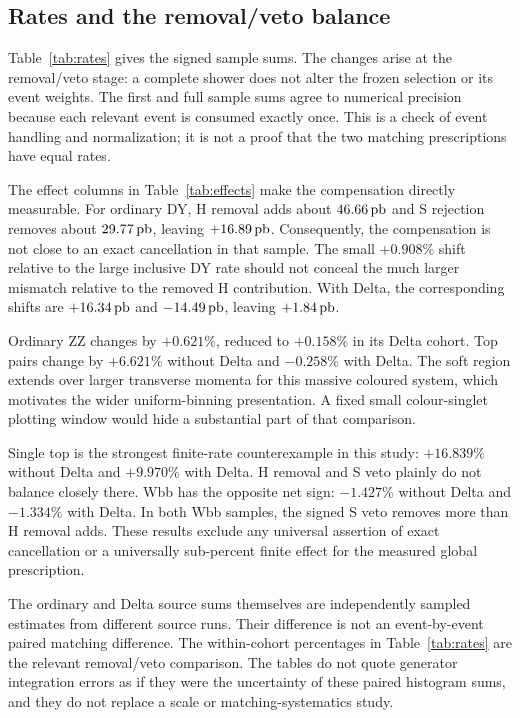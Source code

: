 \subsection{Rates and the removal/veto balance}
\label{sec:rates}
Table~\ref{tab:rates} gives the signed sample sums. The changes arise at
the removal/veto stage: a complete shower does not alter the frozen
selection or its event weights. The first and full sample sums agree to
numerical precision because each relevant event is consumed exactly
once. This is a check of event handling and normalization; it is not a
proof that the two matching prescriptions have equal rates.



The effect columns in Table~\ref{tab:effects} make the compensation
directly measurable. For ordinary DY, H removal adds about $46.66\,\mathrm{pb}$
and S rejection removes about $29.77\,\mathrm{pb}$, leaving $+16.89\,\mathrm{pb}$.
Consequently, the compensation is not close to an exact cancellation in
that sample. The small $+0.908\%$ shift relative to the large inclusive
DY rate should not conceal the much larger mismatch relative to the
removed H contribution. With Delta, the corresponding shifts are
$+16.34\,\mathrm{pb}$ and $-14.49\,\mathrm{pb}$, leaving $+1.84\,\mathrm{pb}$.

Ordinary ZZ changes by $+0.621\%$, reduced to $+0.158\%$ in its Delta
cohort. Top pairs change by $+6.621\%$ without Delta and $-0.258\%$ with
Delta. The soft region extends over larger transverse momenta for this
massive coloured system, which motivates the wider uniform-binning
presentation. A fixed small colour-singlet plotting window would hide a
substantial part of that comparison.

Single top is the strongest finite-rate counterexample in this study:
$+16.839\%$ without Delta and $+9.970\%$ with Delta. H removal and S
veto plainly do not balance closely there. Wbb has the opposite net sign:
$-1.427\%$ without Delta and $-1.334\%$ with Delta. In both Wbb samples,
the signed S veto removes more than H removal adds. These results exclude
any universal assertion of exact cancellation or a universally
sub-percent finite effect for the measured global prescription.

The ordinary and Delta source sums themselves are independently sampled
estimates from different source runs. Their difference is not an
event-by-event paired matching difference. The within-cohort percentages
in Table~\ref{tab:rates} are the relevant removal/veto comparison. The
tables do not quote generator integration errors as if they were the
uncertainty of these paired histogram sums, and they do not replace a
scale or matching-systematics study.

